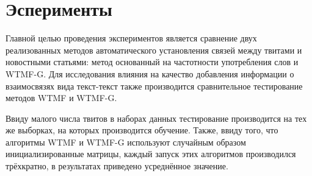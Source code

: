 \section{Эсперименты}
    Главной целью проведения экспериментов является сравнение двух реализованных методов автоматического установления связей между твитами и новостными статьями:
    метод основанный на частотности употребления слов и WTMF-G.
    Для исследования влияния на качество добавления информации о взаимосвязях вида текст-текст также производится сравнительное тестирование методов WTMF и WTMF-G.

    Ввиду малого числа твитов в наборах данных тестирование производится на тех же выборках, на которых производится обучение.
    Также, ввиду того, что алгоритмы WTMF и WTMF-G используют случайным образом инициализированные матрицы, каждый запуск этих алгоритмов производился трёхкратно,
    в результатах приведено усреднённое значение.

    
    
    
    


